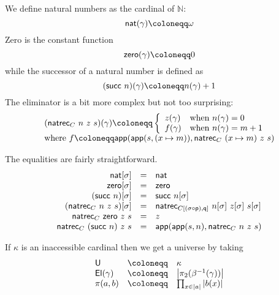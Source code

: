 
We define natural numbers as the cardinal of \(\mathbb{N}\):
\[
  \nat(\gamma) \coloneqq \omega
\]
Zero is the constant function
\[
  \czero(\gamma) \coloneqq 0
\]
while the successor of a natural number is defined as
\[
  (\csucc\ n)(\gamma) \coloneqq n(\gamma) + 1
\]
The eliminator is a bit more complex but not too surprising:
\[
  \begin{array}{l}
    (\natrec_C\ n\ z\ s)(\gamma) \coloneqq
    \left\{
    \begin{array}{ll}
      z(\gamma) & \text{when \(n(\gamma) = 0\)} \\
      f(\gamma) &
      \text{when \(n(\gamma) = m + 1\)}
    \end{array}
    \right. \\
    \text{where } f \coloneqq
    \capp(\capp(s, (x \mapsto m)), \natrec_C\ (x \mapsto m)\ z\ s)
  \end{array}
\]

The equalities are fairly straightforward.
\[
  \begin{array}{rcl}
    \nat[\sigma] &=& \nat \\
    \czero[\sigma] &=& \czero \\
    (\csucc\ n)[\sigma] &=& \csucc\ n[\sigma] \\
    (\natrec_C\ n\ z\ s)[\sigma] &=&
    \natrec_{C[(\sigma \circ \pp), \pq]}\ n[\sigma]\ z[\sigma]\ s[\sigma] \\
    \natrec_C\ \czero\ z\ s &=& z \\
    \natrec_C\ (\csucc\ n)\ z\ s &=& \capp(\capp(s,n), \natrec_C\ n\ z\ s)
  \end{array}
\]


If \(\kappa\) is an inaccessible cardinal then we get a universe by taking
\[
  \begin{array}{lcl}
    \CU &\coloneqq& \kappa \\
    \CEl(\gamma) &\coloneqq& \card{\pi_2(\beta^{-1}(\gamma))} \\
    \pi(a,b) &\coloneqq& \prod_{x \in \card{a}} \card{b(x)}
  \end{array}
\]

